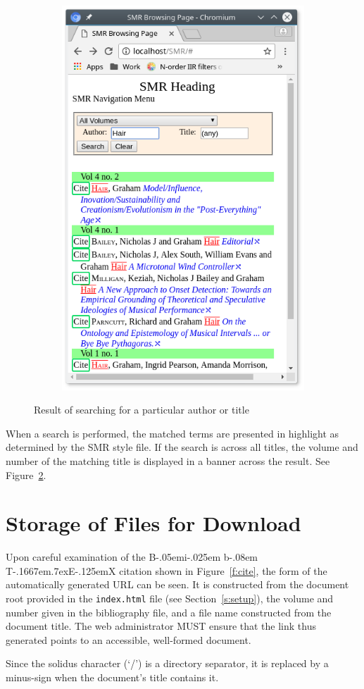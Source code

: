 \documentclass[a4paper,10pt]{SMR}
\def\BibTeX{{\rm B\kern-.05em{\sc i\kern-.025em b}\kern-.08em
    T\kern-.1667em\lower.7ex\hbox{E}\kern-.125emX}}
\begin{document}
\begin{figure}
\begin{subfigure}[t]{0.45\textwidth}
  \includegraphics[width=\textwidth]{SMR_page-search-all.png}
  \label{sf:allvols}
 \end{subfigure}
 \caption{Result of searching for a particular author or title}
 \label{f:searchresult}
\end{figure}
When a search is performed, the matched terms are presented in highlight
as determined by the SMR style file. If the search is across all titles,
the volume and number of the matching title is displayed in a banner
across the result. See Figure~\ref{f:searchresult}.

\section{Storage of Files for Download}
Upon careful examination of the \BibTeX{} citation shown in
Figure~\ref{f:cite}, the form of the automatically generated
URL can be seen. It is constructed from the document root provided
in the \texttt{index.html} file (see Section~\ref{s:setup}),
the volume and number given in the bibliography file, and
a file name constructed from the document title.
The web administrator MUST ensure that the link thus
generated points to an accessible, well-formed document.

Since the solidus character (`/') is a directory separator,
it is replaced by a minus-sign when the document's title contains it.
\end{document}
